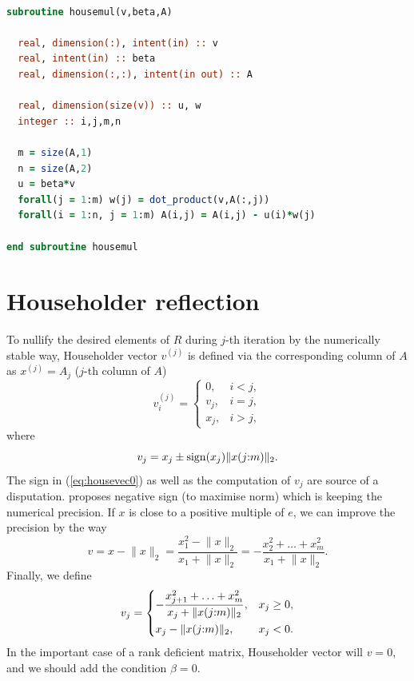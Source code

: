 \begin{refsection}
\begin{lstlisting}[float,language=Fortran,basicstyle=\ttfamily,
    caption={Householder matrix multiplication in Fortran},label={src:housemul}]

subroutine housemul(v,beta,A)

  real, dimension(:), intent(in) :: v
  real, intent(in) :: beta
  real, dimension(:,:), intent(in out) :: A

  real, dimension(size(v)) :: u, w
  integer :: i,j,m,n

  m = size(A,1)
  n = size(A,2)
  u = beta*v
  forall(j = 1:m) w(j) = dot_product(v,A(:,j))
  forall(i = 1:n, j = 1:m) A(i,j) = A(i,j) - u(i)*w(j)

end subroutine housemul
\end{lstlisting}




\section{Householder reflection}
\label{sec:house}

To nullify the desired elements of $R$ during $j$-th iteration
by the numerically stable way,
Householder vector $v^{(j)}$ is defined via the corresponding
column of $A$ as $x^{(j)} = A_j$ ($j$-th column of $A$)
\begin{equation} \label{eq:housevec}
  v_i^{(j)} =
  \begin{cases}
    0, & i < j,\\
    v_j, & i = j,\\
    x_j, & i > j,
  \end{cases}
\end{equation}
where
\begin{equation} \label{eq:housevec0}
  v_j = x_j \pm \operatorname{sign}(x_j) \lVert x(j{:}m) \rVert_2.
\end{equation}
The sign in (\ref{eq:housevec0}) as well as the computation of $v_j$
are source of a disputation. \cite{golub2013matrix}
proposes negative sign (to maximise norm) which is keeping the numerical
precision. If $x$ is close to a positive multiple of $e$,
we can improve the precision by the way
\[
v = x - \lVert x \rVert_2 =
\frac{x_1^2 - \lVert x\rVert_2}{x_1 + \lVert x \rVert_2} =
-\frac{x_2^2 + \ldots + x_m^2}{x_1 + \lVert x \rVert_2}.
\]
Finally, we define
\begin{equation} \label{eq:vj}
v_j =
\begin{dcases}
  -\frac{x_{j+1}^2 + \ldots + x_m^2}{x_j + \lVert x(j{:}m) \rVert_2}, & x_j \ge 0,\\
  x_j - \lVert x(j{:}m) \rVert_2, & x_j < 0.
\end{dcases}
\end{equation}
In the important case of a rank deficient matrix,
Householder vector will $v = 0$,
and we should add the condition $\beta = 0$.


\end{refsection}
